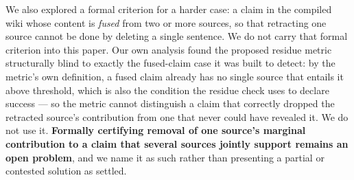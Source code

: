 We also explored a formal criterion for a harder case: a claim in the compiled wiki whose content is \emph{fused} from two or more sources, so that retracting one source cannot be done by deleting a single sentence. We do not carry that formal criterion into this paper. Our own analysis found the proposed residue metric structurally blind to exactly the fused-claim case it was built to detect: by the metric's own definition, a fused claim already has no single source that entails it above threshold, which is also the condition the residue check uses to declare success --- so the metric cannot distinguish a claim that correctly dropped the retracted source's contribution from one that never could have revealed it. We do not use it. \textbf{Formally certifying removal of one source's marginal contribution to a claim that several sources jointly support remains an open problem}, and we name it as such rather than presenting a partial or contested solution as settled.
